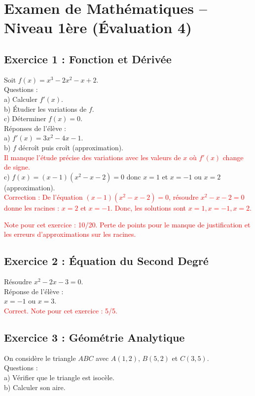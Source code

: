 \documentclass{article}
\begin{document}
\section*{Examen de Mathématiques – Niveau 1ère (Évaluation 4)}

\subsection*{Exercice 1 : Fonction et Dérivée}
Soit $f(x) = x^3 - 2x^2 - x + 2$.\\
Questions :\\
a) Calculer $f'(x)$.\\
b) Étudier les variations de $f$.\\
c) Déterminer $f(x) = 0$.\\

Réponses de l’élève :\\
a) $f'(x) = 3x^2 - 4x - 1$. \\
b) $f$ décroît puis croît (approximation). \\ 
\textcolor{red}{Il manque l'étude précise des variations avec les valeurs de $x$ où $f'(x)$ change de signe.} \\
c) $f(x) = (x - 1)(x^2 - x - 2) = 0$ donc $x = 1$ et $x = -1$ ou $x = 2$ (approximation). \\
\textcolor{red}{Correction : De l'équation $(x - 1)(x^2 - x - 2) = 0$, résoudre $x^2 - x - 2 = 0$ donne les racines : $x = 2$ et $x = -1$. Donc, les solutions sont $x = 1, x = -1, x = 2$.}

\textcolor{red}{Note pour cet exercice : 10/20. Perte de points pour le manque de justification et les erreurs d'approximations sur les racines.}

\subsection*{Exercice 2 : Équation du Second Degré}
Résoudre $x^2 - 2x - 3 = 0$.\\
Réponse de l’élève :\\
$x = -1$ ou $x = 3$.\\

\textcolor{red}{Correct. Note pour cet exercice : 5/5.}

\subsection*{Exercice 3 : Géométrie Analytique}
On considère le triangle $ABC$ avec $A(1, 2)$, $B(5, 2)$ et $C(3, 5)$.\\
Questions :\\
a) Vérifier que le triangle est isocèle.\\
b) Calculer son aire.\\
\end{document}
